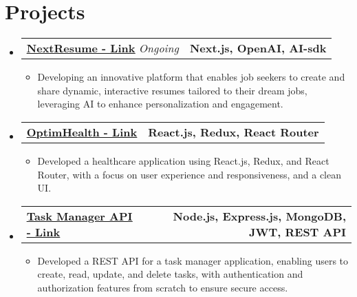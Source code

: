 \documentclass[letterpaper,11pt]{article}
\makeatletter
\newcommand{\resumeItem}[1]{
  \item\small{
    {#1 \vspace{-2pt}}
  }
}
\newcommand{\resumeProjectHeading}[2]{
    \item
    \begin{tabular*}{1.001\textwidth}{l@{\extracolsep{\fill}}r}
      \small#1 & \textbf{\small #2}\\
    \end{tabular*}\vspace{-7pt}
}
\newcommand{\resumeSubHeadingListStart}{\begin{itemize}[leftmargin=0.0in, label={}]}
\newcommand{\resumeSubHeadingListEnd}{\end{itemize}}
\newcommand{\resumeItemListStart}{\begin{itemize}}
\newcommand{\resumeItemListEnd}{\end{itemize}\vspace{-5pt}}
\makeatother
\begin{document}
\section{Projects}
\vspace{-6pt}
\resumeSubHeadingListStart
    \resumeProjectHeading
      {\href{https://nextresume.app/}{\underline{\textbf{NextResume - Link}}}  \emph{Ongoing}}{Next.js, OpenAI, AI-sdk}
      \resumeItemListStart
        \resumeItem{Developing an innovative platform that enables job seekers to create and share dynamic, interactive resumes tailored to their dream jobs, leveraging AI to enhance personalization and engagement.}
      \resumeItemListEnd
    \vspace{-16pt}
        \resumeProjectHeading
        {\href{https://github.com/sgandhi15/hc-static}{\underline{\textbf{OptimHealth - Link}}}  \emph{}}{React.js, Redux, React Router}
        \resumeItemListStart
          \resumeItem{Developed a healthcare application using React.js, Redux, and React Router, with a focus on user experience and responsiveness, and a clean UI.}
        \resumeItemListEnd
        \vspace{-16pt}
    \resumeProjectHeading
        {\href{https://github.com/sgandhi15/task-manager-api}{\underline{\textbf{Task Manager API - Link}}}  \emph{}}{Node.js, Express.js, MongoDB, JWT, REST API}
        \resumeItemListStart
            \resumeItem{Developed a REST API for a task manager application, enabling users to create, read, update, and delete tasks, with authentication and authorization features from scratch to ensure secure access.}
        \resumeItemListEnd
  \resumeSubHeadingListEnd
\vspace{-15pt}
\end{document}

